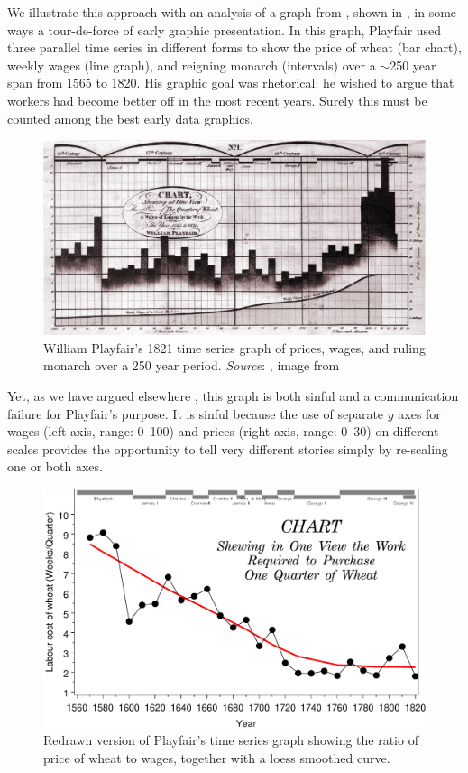 We illustrate this approach with an analysis of a graph from \citet{Playfair:1821},
shown in , in some ways a tour-de-force of
early graphic presentation. In this graph, Playfair used three parallel time
series in different forms
to show the price of wheat (bar chart), weekly wages (line graph), and reigning monarch (intervals)
over a $\sim$250 year span from 1565 to 1820. His graphic goal was rhetorical: he wished to
argue that workers had become better off in the most recent years. Surely this must be counted
among the best early data graphics.

\begin{figure}[htb]
  \centering
  \includegraphics[width=\textwidth]{fig/playfair-wheat2}
  \caption{William Playfair's 1821 time series graph of prices, wages, and ruling monarch
  over a 250 year period.
  \emph{Source}: \cite{Playfair:1821}, image from \citet[p. 34]{Tufte:1983}}%
  \label{fig:playfair-wheat1}
\end{figure}

Yet, as we have argued elsewhere \citep{FriendlyDenis:05:scat}, this graph is both sinful
and a communication failure for Playfair's purpose.  It is sinful because the use of separate $y$ axes for
wages (left axis, range: 0--100) and prices (right axis, range: 0--30) on different scales
provides the opportunity to tell very different stories simply by re-scaling one or both
axes.

\begin{figure}[!htb]
  \centering
  \includegraphics[width=.9\textwidth,clip]{fig/wheat1}
  \caption{Redrawn version of Playfair's time series graph
  showing the ratio of price of wheat to wages,
  together with a loess smoothed curve.}
  \label{fig:wheat1}
\end{figure}


